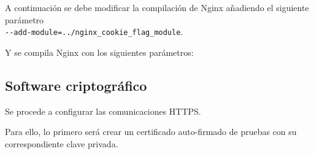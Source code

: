 \par A continuación se debe modificar la compilación de Nginx añadiendo el siguiente parámetro \\ \lstinline{--add-module=../nginx_cookie_flag_module}.

\par Y se compila Nginx con los siguientes parámetros:\\
\begin{minipage}{\linewidth}
  
\end{minipage}

\subsection{Software criptográfico}
\par Se procede a configurar las comunicaciones HTTPS.
\par Para ello, lo primero será crear un certificado auto-firmado de pruebas con su correspondiente clave privada. \\
\begin{minipage}{\linewidth}
  
\end{minipage}

